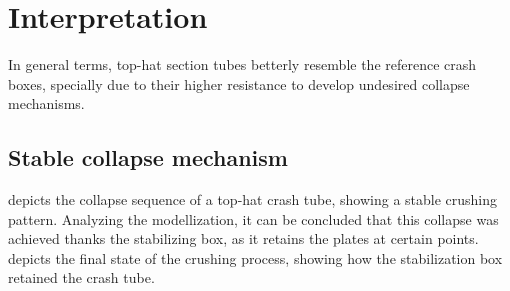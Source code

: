 \documentclass[
documentsize = a4, %
font = cmr, %
typesize = 11, %
printmode = true,
onehalfspacing = true,
language = en, %
titlepage = udciccp, %
degree = pt, %
dedication = true,
acknowledgements = true,
abstract-en = true,
abstract-es = false,
abstract-ga = false,
epigraphs = true,
toc = true,
lof = true,
lot = true,
frontmatterintoc = false,
notation = false,
minimal = false,
]{UDCthesis}
\begin{document}
\section{Interpretation}  %
\label{sec:interpretation}

In general terms, top-hat section tubes betterly resemble the reference crash boxes, specially due to their higher resistance to develop undesired collapse mechanisms.

\subsection{Stable collapse mechanism}

 depicts the collapse sequence of a top-hat crash tube, showing a stable crushing pattern. Analyzing the modellization, it can be concluded that this collapse was achieved thanks the stabilizing box, as it retains the plates at certain points.  depicts the final state of the crushing process, showing how the stabilization box retained the crash tube.
\end{document}
